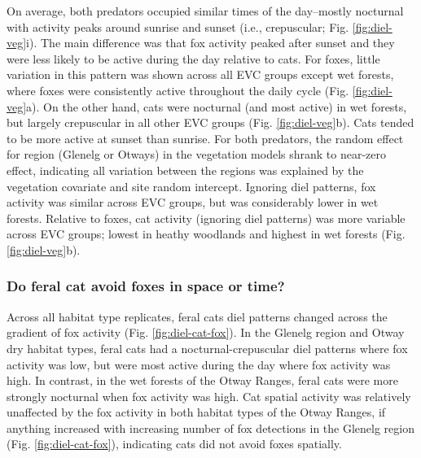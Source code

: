 \documentclass[11pt,a4paper,titlepage,twoside,openright]{style/unimelbthesis}
\begin{document}
\begin{mainmatter}
On average, both predators occupied similar times of the day--mostly nocturnal with activity peaks around sunrise and sunset (i.e., crepuscular; Fig. \ref{fig:diel-veg}i). The main difference was that fox activity peaked after sunset and they were less likely to be active during the day relative to cats. For foxes, little variation in this pattern was shown across all EVC groups except wet forests, where foxes were consistently active throughout the daily cycle (Fig. \ref{fig:diel-veg}a). On the other hand, cats were nocturnal (and most active) in wet forests, but largely crepuscular in all other EVC groups (Fig. \ref{fig:diel-veg}b). Cats tended to be more active at sunset than sunrise. For both predators, the random effect for region (Glenelg or Otways) in the vegetation models shrank to near-zero effect, indicating all variation between the regions was explained by the vegetation covariate and site random intercept. Ignoring diel patterns, fox activity was similar across EVC groups, but was considerably lower in wet forests. Relative to foxes, cat activity (ignoring diel patterns) was more variable across EVC groups; lowest in heathy woodlands and highest in wet forests (Fig. \ref{fig:diel-veg}b).

\hypertarget{do-feral-cat-avoid-foxes-in-space-or-time-1}{%
\subsubsection{Do feral cat avoid foxes in space or time?}\label{do-feral-cat-avoid-foxes-in-space-or-time-1}}

Across all habitat type replicates, feral cats diel patterns changed across the gradient of fox activity (Fig. \ref{fig:diel-cat-fox}). In the Glenelg region and Otway dry habitat types, feral cats had a nocturnal-crepuscular diel patterns where fox activity was low, but were most active during the day where fox activity was high. In contrast, in the wet forests of the Otway Ranges, feral cats were more strongly nocturnal when fox activity was high. Cat spatial activity was relatively unaffected by the fox activity in both habitat types of the Otway Ranges, if anything increased with increasing number of fox detections in the Glenelg region (Fig. \ref{fig:diel-cat-fox}), indicating cats did not avoid foxes spatially.

\newpage
\begin{figure}


\end{figure}
\end{mainmatter}
\end{document}
